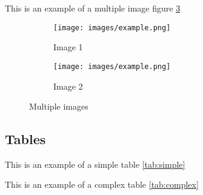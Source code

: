         This is an example of a multiple image figure \ref{img:multiple}
        
        \begin{figure}[htbp]
        \begin{subfigure}[t]{0.5\linewidth}
        \centering
        \texttt{[image: images/example.png]}
        \caption{Image 1}
        \label{subfig:img1}
        \end{subfigure}%
        \begin{subfigure}[t]{0.5\linewidth}
        \centering
        \texttt{[image: images/example.png]}
        \caption{Image 2}
        \label{subfig:img2}
        \end{subfigure}
        \caption{Multiple images}
        \label{img:multiple}
        \end{figure}
        
        
    \subsection{Tables}
        This is an example of a simple table \ref{tab:simple}

        \begin{table}[H]
        \centering
        \caption{Simple table}
        \label{tab:simple}
        \end{table}

        This is an example of a complex table \ref{tab:complex}
        
